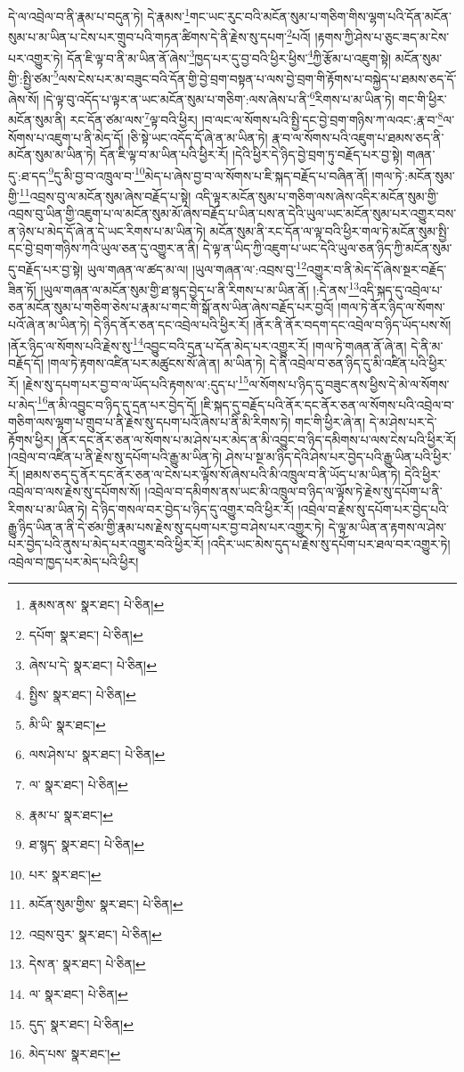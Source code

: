 དེ་ལ་འབྲེལ་བ་ནི་རྣམ་པ་བདུན་ཏེ། དེ་རྣམས་\footnote{རྣམས་ནས་  སྣར་ཐང་།  པེ་ཅིན། }གང་ཡང་རུང་བའི་མངོན་སུམ་པ་གཅིག་གིས་ལྷག་པའི་དོན་མངོན་སུམ་པ་མ་ཡིན་པ་ངེས་པར་གྲུབ་པའི་གཏན་ཚིགས་དེ་ནི་རྗེས་སུ་དཔག་\footnote{དཔོག་  སྣར་ཐང་།  པེ་ཅིན། }པའོ། །རྟགས་ཀྱི་ཤེས་པ་ཅུང་ཟད་མ་ངེས་པར་འགྱུར་ཏེ། དོན་ཇི་ལྟ་བ་ནི་མ་ཡིན་ནོ་ཞེས་\footnote{ཞེས་པ་དེ་  སྣར་ཐང་།  པེ་ཅིན། }ཁྱད་པར་དུ་བྱ་བའི་ཕྱིར་ཕྱིས་\footnote{སྤྱིས་  སྣར་ཐང་།  པེ་ཅིན། }ཀྱི་རྩོམ་པ་འཇུག་སྟེ། མངོན་སུམ་གྱི་:སྤྱི་ཙམ་\footnote{མི་ཡི་  སྣར་ཐང་། }ལས་ངེས་པར་མ་བཟུང་བའི་དོན་གྱི་བྱེ་བྲག་བསྟན་པ་ལས་བྱེ་བྲག་གི་རྟོགས་པ་བསྐྱེད་པ་ཐམས་ཅད་དོ་ཞེས་སོ། །དེ་ལྟ་བུ་འདོད་པ་ལྟར་ན་ཡང་མངོན་སུམ་པ་གཅིག་:ལས་ཞེས་པ་ནི་\footnote{ལས་ཤེས་པ་  སྣར་ཐང་།  པེ་ཅིན། }རིགས་པ་མ་ཡིན་ཏེ། གང་གི་ཕྱིར་མངོན་སུམ་ནི། རང་དོན་ཙམ་ལས་\footnote{ལ་  སྣར་ཐང་།  པེ་ཅིན། }ལྟ་བའི་ཕྱིར། །བ་ལང་ལ་སོགས་པའི་སྤྱི་དང་བྱེ་བྲག་གཉིས་ཀ་ལའང་:རྣ་བ་\footnote{རྣམ་པ་  སྣར་ཐང་། }ལ་སོགས་པ་འཇུག་པ་ནི་མེད་དོ། །ཅི་སྟེ་ཡང་འདོད་དོ་ཞེ་ན་མ་ཡིན་ཏེ། རྣ་བ་ལ་སོགས་པའི་འཇུག་པ་ཐམས་ཅད་ནི་མངོན་སུམ་མ་ཡིན་ཏེ། དོན་ཇི་ལྟ་བ་མ་ཡིན་པའི་ཕྱིར་རོ། །དེའི་ཕྱིར་དེ་ཉིད་བྱེ་བྲག་ཏུ་བརྗོད་པར་བྱ་སྟེ། གཞན་དུ་:ཐ་དད་\footnote{ཐ་སྙད་  སྣར་ཐང་།  པེ་ཅིན། }དུ་མི་བྱ་བ་འཁྲུལ་བ་\footnote{པར་  སྣར་ཐང་། }མེད་པ་ཞེས་བྱ་བ་ལ་སོགས་པ་ཇི་སྐད་བརྗོད་པ་བཞིན་ནོ། །གལ་ཏེ་:མངོན་སུམ་གྱི་\footnote{མངོན་སུམ་གྱིས་  སྣར་ཐང་།  པེ་ཅིན། }འབྲས་བུ་ལ་མངོན་སུམ་ཞེས་བརྗོད་པ་སྟེ། འདི་ལྟར་མངོན་སུམ་པ་གཅིག་ལས་ཞེས་འདིར་མངོན་སུམ་གྱི་འབྲས་བུ་ཡིན་གྱི་འཇུག་པ་ལ་མངོན་སུམ་མོ་ཞེས་བརྗོད་པ་ཡིན་པས་ན་དེའི་ཡུལ་ཡང་མངོན་སུམ་པར་འགྱུར་བས་ན་ཉེས་པ་མེད་དོ་ཞེ་ན་དེ་ཡང་རིགས་པ་མ་ཡིན་ཏེ། མངོན་སུམ་ནི་རང་དོན་ལ་ལྟ་བའི་ཕྱིར་གལ་ཏེ་མངོན་སུམ་སྤྱི་དང་བྱེ་བྲག་གཉིས་ཀའི་ཡུལ་ཅན་དུ་འགྱུར་ན་ནི། དེ་ལྟ་ན་ཡིད་ཀྱི་འཇུག་པ་ཡང་དེའི་ཡུལ་ཅན་ཉིད་ཀྱི་མངོན་སུམ་དུ་བརྗོད་པར་བྱ་སྟེ། ཡུལ་གཞན་ལ་ཚད་མ་ལ། །ཡུལ་གཞན་ལ་:འབྲས་བུ་\footnote{འབྲས་བུར་  སྣར་ཐང་།  པེ་ཅིན། }འགྱུར་བ་ནི་མེད་དོ་ཞེས་སྔར་བརྗོད་ཟིན་ཏོ། །ཡུལ་གཞན་ལ་མངོན་སུམ་གྱི་ཐ་སྙད་བྱེད་པ་ནི་རིགས་པ་མ་ཡིན་ནོ། །:དེ་ནས་\footnote{དེས་ན་  སྣར་ཐང་།  པེ་ཅིན། }འདི་སྐད་དུ་འབྲེལ་པ་ཅན་མངོན་སུམ་པ་གཅིག་ཅེས་པ་རྣམ་པ་གང་གི་སྒོ་ནས་ཡིན་ཞེས་བརྗོད་པར་བྱའོ། །གལ་ཏེ་ནོར་ཉིད་ལ་སོགས་པའོ་ཞེ་ན་མ་ཡིན་ཏེ། དེ་ཉིད་ནོར་ཅན་དང་འབྲེལ་པའི་ཕྱིར་རོ། །ནོར་ནི་ནོར་བདག་དང་འབྲེལ་བ་ཉིད་ཡོད་པས་སོ། །ནོར་ཉིད་ལ་སོགས་པའི་རྗེས་སུ་\footnote{ལ་  སྣར་ཐང་།  པེ་ཅིན། }འབྱུང་བའི་དྲན་པ་དོན་མེད་པར་འགྱུར་རོ། །གལ་ཏེ་གཞན་ནོ་ཞེ་ན། དེ་ནི་མ་བརྗོད་དོ། །གལ་ཏེ་རྟགས་འཛིན་པར་མཚུངས་སོ་ཞེ་ན། མ་ཡིན་ཏེ། དེ་ནི་འབྲེལ་བ་ཅན་ཉིད་དུ་མི་འཛིན་པའི་ཕྱིར་རོ། །རྗེས་སུ་དཔག་པར་བྱ་བ་ལ་ཡོད་པའི་རྟགས་ལ་:དུད་པ་\footnote{དུད་  སྣར་ཐང་།  པེ་ཅིན། }ལ་སོགས་པ་ཉིད་དུ་བཟུང་ནས་ཕྱིས་དེ་མེ་ལ་སོགས་པ་མེད་\footnote{མེད་པས་  སྣར་ཐང་། }ན་མི་འབྱུང་བ་ཉིད་དུ་དྲན་པར་བྱེད་དོ། །ཇི་སྐད་དུ་བརྗོད་པའི་ནོར་དང་ནོར་ཅན་ལ་སོགས་པའི་འབྲེལ་བ་གཅིག་ལས་ལྷག་པ་གྲུབ་པ་ནི་རྗེས་སུ་དཔག་པའོ་ཞེས་པ་ནི་མི་རིགས་ཏེ། གང་གི་ཕྱིར་ཞེ་ན། དེ་མ་ཤེས་པར་དེ་རྟོགས་ཕྱིར། །ནོར་དང་ནོར་ཅན་ལ་སོགས་པ་མ་ཤེས་པར་མེད་ན་མི་འབྱུང་བ་ཉིད་དམིགས་པ་ལས་ངེས་པའི་ཕྱིར་རོ། །འབྲེལ་བ་འཛིན་པ་ནི་རྗེས་སུ་དཔོག་པའི་རྒྱུ་མ་ཡིན་ཏེ། ཤེས་པ་སྔ་མ་ཉིད་དེའི་ཤེས་པར་བྱེད་པའི་རྒྱུ་ཡིན་པའི་ཕྱིར་རོ། །ཐམས་ཅད་དུ་ནོར་དང་ནོར་ཅན་ལ་ངེས་པར་ལྟོས་སོ་ཞེས་པའི་མི་འཁྲུལ་བ་ནི་ཡོད་པ་མ་ཡིན་ཏེ། དེའི་ཕྱིར་འབྲེལ་བ་ལས་རྗེས་སུ་དཔོགས་སོ། །འབྲེལ་བ་དམིགས་ནས་ཡང་མི་འཁྲུལ་བ་ཉིད་ལ་ལྟོས་ཏེ་རྗེས་སུ་དཔོག་པ་ནི་རིགས་པ་མ་ཡིན་ཏེ། དེ་ཉིད་གསལ་བར་བྱེད་པ་ཉིད་དུ་འགྱུར་བའི་ཕྱིར་རོ། །འབྲེལ་བ་རྗེས་སུ་དཔོག་པར་བྱེད་པའི་རྒྱུ་ཉིད་ཡིན་ན་ནི་དེ་ཙམ་གྱི་རྣམ་པས་རྗེས་སུ་དཔག་པར་བྱ་བ་ཤེས་པར་འགྱུར་ཏེ། དེ་ལྟ་མ་ཡིན་ན་རྟགས་ལ་ཤེས་པར་བྱེད་པའི་ནུས་པ་མེད་པར་འགྱུར་བའི་ཕྱིར་རོ། །འདིར་ཡང་མེས་དུད་པ་རྗེས་སུ་དཔོག་པར་ཐལ་བར་འགྱུར་ཏེ། འབྲེལ་བ་ཁྱད་པར་མེད་པའི་ཕྱིར། 